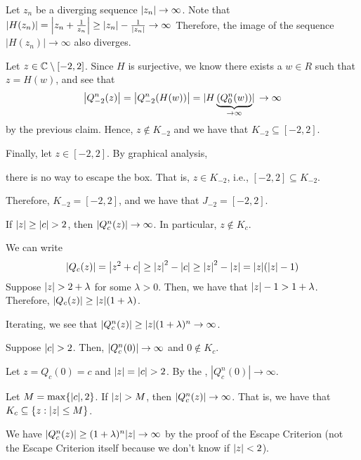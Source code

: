 \documentclass[class=pmath370,tikz,notes]{agony}
\begin{document}
\begin{sol}
  Let $z_n$ be a diverging sequence $\abs{z_n} \to \infty$.
  Note that $\abs{H(z_n)} = \abs{z_n + \frac{1}{z_n}} \geq \abs{z_n} - \frac{1}{\abs{z_n}} \to \infty$
  Therefore, the image of the sequence $|H(z_n)| \to \infty$ also diverges.

  Let $z \in \mathbb{C} \setminus [-2, 2]$.
  Since $H$ is surjective, we know there exists a $w \in R$ such that $z=H(w)$,
  and see that
  \[
    \abs{Q_{-2}^n(z)}
    = \abs{Q_{-2}^n(H(w))}
    = \abs*{H\underbrace{(Q_0^n(w))}_{\to \infty}} \to \infty
  \]
  by the previous claim.
  Hence, $z \not\in K_{-2}$ and we have that $K_{-2} \subseteq [-2,2]$.

  Finally, let $z \in [-2, 2]$.
  By graphical analysis,
  \begin{center}
  \end{center}
  there is no way to escape the box.
  That is, $z \in K_{-2}$, i.e., $[-2,2] \subseteq K_{-2}$.

  Therefore, $K_{-2} = [-2, 2]$, and we have that $J_{-2} =[-2,2]$.
\end{sol}

\begin{prop}\label{prop:esc}
  If $\abs{z} \geq \abs{c} > 2$, then $\abs{Q_c^n(z)} \to \infty$.
  In particular, $z \not\in K_c$.
\end{prop}
\begin{prf}
  We can write
  \[ \abs{Q_c(z)} = \abs{z^2+c} \geq \abs{z}^2 - \abs{c} \geq \abs{z}^2 - \abs{z} = \abs{z}(\abs{z}-1) \]
  Suppose $\abs{z} > 2 + \lambda$ for some $\lambda > 0$.
  Then, we have that $\abs{z} - 1 > 1+\lambda$.
  Therefore, $\abs{Q_c(z)} \geq \abs{z}(1+\lambda)$.

  Iterating, we see that $\abs{Q_c^n(z)} \geq \abs{z}(1+\lambda)^n \to \infty$.
\end{prf}

\begin{corollary}
  Suppose $\abs{c} > 2$. Then, $\abs{Q_c^n(0)} \to \infty$ and $0 \not\in K_c$.
\end{corollary}
\begin{prf}
  Let $z = Q_c(0) = c$ and $\abs{z} = \abs{c} > 2$.
  By the , $|Q_c^n(0)| \to \infty$.
\end{prf}

\begin{corollary}
  Let $M = \max\{\abs{c}, 2\}$.
  If $\abs{z} > M$, then $\abs{Q_c^n(z)} \to \infty$.
  That is, we have that $K_c \subseteq \{z : \abs{z} \leq M\}$.
\end{corollary}
\begin{prf}
  We have $\abs{Q_c^n(z)} \geq (1+\lambda)^n\abs{z} \to \infty$
  by the proof of the Escape Criterion
  (not the Escape Criterion itself because we don't know if $\abs{z} < 2$).
\end{prf}
\end{document}
